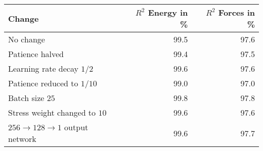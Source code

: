 \begin{tabular}{l r r}
\toprule
Change                                    &              $R^2$ Energy in \%  &              $R^2$ Forces in \% \\ 
\midrule
No change                                 &                            99.5  &                            97.6 \\ 
Patience halved                           &                            99.4  &                            97.5 \\ 
Learning rate decay $1/2$                 &                            99.6  &                            97.6 \\ 
Patience reduced to $1/10$                &                            99.0  &                            97.0 \\ 
Batch size $25$                           &                            99.8  &                            97.8 \\ 
Stress weight changed to $10$             &                            99.6  &                            97.6 \\ 
$256 \rightarrow 128 \rightarrow 1$ output network  &                            99.6  &                            97.7 \\ 
\bottomrule
\end{tabular}
